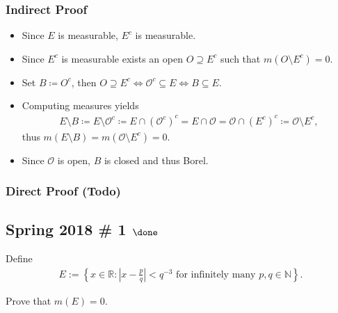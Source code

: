 \begin{solution}
\begin{concept}
\end{concept}

\hypertarget{indirect-proof}{%
\subsubsection{Indirect Proof}\label{indirect-proof}}

\begin{itemize}
\tightlist
\item
  Since \(E\) is measurable, \(E^c\) is measurable.
\item
  Since \(E^c\) is measurable exists an open \(O\supseteq E^c\) such
  that \(m(O\setminus E^c) = 0\).
\item
  Set \(B \coloneqq O^c\), then
  \(O\supseteq E^c \iff {\mathcal{O}}^c \subseteq E \iff B\subseteq E\).
\item
  Computing measures yields
  \begin{align*}
  E\setminus B \coloneqq E\setminus  {\mathcal{O}}^c \coloneqq E\cap({\mathcal{O}}^c)^c = E\cap{\mathcal{O}}= {\mathcal{O}}\cap(E^c)^c \coloneqq{\mathcal{O}}\setminus E^c
  ,\end{align*}
  thus \(m(E\setminus B) = m({\mathcal{O}}\setminus E^c) = 0\).
\item
  Since \({\mathcal{O}}\) is open, \(B\) is closed and thus Borel.
\end{itemize}

\hypertarget{direct-proof-todo}{%
\subsubsection{Direct Proof (Todo)}\label{direct-proof-todo}}


\end{solution}

\hypertarget{spring-2018-1-done}{%
\subsection{\texorpdfstring{Spring 2018 \# 1
\(\done\)}{Spring 2018 \# 1 \textbackslash done}}\label{spring-2018-1-done}}

Define
\begin{align*}
E:=\left\{x \in \mathbb{R}:\left|x-\frac{p}{q}\right|<q^{-3} \text { for infinitely many } p, q \in \mathbb{N}\right\}.
\end{align*}

Prove that \(m(E) = 0\).

